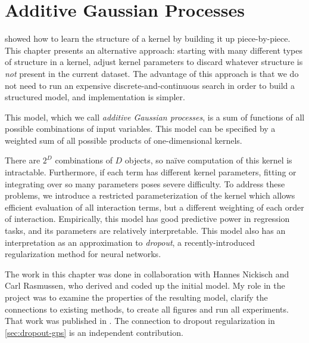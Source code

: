 
\inbpdocument



\chapter{Additive Gaussian Processes}
\label{ch:additive}





 showed how to learn the structure of a kernel by building it up piece-by-piece.
This chapter presents an alternative approach: starting with many different types of structure in a kernel, adjust kernel parameters to discard whatever structure is \emph{not} present in the current dataset.
The advantage of this approach is that we do not need to run an expensive discrete-and-continuous search in order to build a structured model, and implementation is simpler.

This model, which we call \emph{additive Gaussian processes}, is a sum of functions of all possible combinations of input variables.
This model can be specified by a weighted sum of all possible products of one-dimensional kernels.

There are $2^D$ combinations of $D$ objects, so na\"{i}ve computation of this kernel is intractable.
Furthermore, if each term has different kernel parameters, fitting or integrating over so many parameters poses severe difficulty.
To address these problems, we introduce a restricted parameterization of the kernel which allows efficient evaluation of all interaction terms, but a different weighting of each order of interaction.
Empirically, this model has good predictive power in regression tasks, and its parameters are relatively interpretable.
This model also has an interpretation as an approximation to \emph{dropout}, a recently-introduced regularization method for neural networks.

The work in this chapter was done in collaboration with Hannes Nickisch and Carl Rasmussen, who derived and coded up the initial model.
My role in the project was to examine the properties of the resulting model, clarify the connections to existing methods, to create all figures and run all experiments.
That work was published in \citet{duvenaud2011additive11}.
The connection to dropout regularization in \cref{sec:dropout-gps} is an independent contribution.






